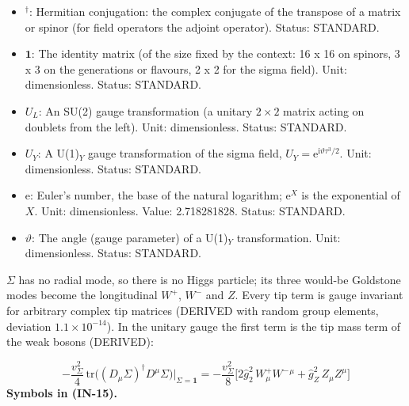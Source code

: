 \documentclass[
  10pt,
]{article}
\begin{document}
\begin{itemize}
\item
  \({}^\dagger\): Hermitian conjugation: the complex conjugate of the
  transpose of a matrix or spinor (for field operators the adjoint
  operator). Status: STANDARD.
\item
  \(\mathbf{1}\): The identity matrix (of the size fixed by the context:
  16 x 16 on spinors, 3 x 3 on the generations or flavours, 2 x 2 for
  the sigma field). Unit: dimensionless. Status: STANDARD.
\item
  \(U_L\): An SU(2) gauge transformation (a unitary \(2 \times 2\)
  matrix acting on doublets from the left). Unit: dimensionless. Status:
  STANDARD.
\item
  \(U_Y\): A U(1)\(_Y\) gauge transformation of the sigma field,
  \(U_Y = \mathrm{e}^{\mathrm{i}\vartheta\tau^3/2}\). Unit:
  dimensionless. Status: STANDARD.
\item
  \(\mathrm{e}\): Euler's number, the base of the natural logarithm;
  \(\mathrm{e}^{X}\) is the exponential of \(X\). Unit: dimensionless.
  Value: 2.718281828. Status: STANDARD.
\item
  \(\vartheta\): The angle (gauge parameter) of a U(1)\(_Y\)
  transformation. Unit: dimensionless. Status: STANDARD.
\end{itemize}

\(\Sigma\) has no radial mode, so there is no Higgs particle; its three
would-be Goldstone modes become the longitudinal \(W^+\), \(W^-\) and
\(Z\). Every tip term is gauge invariant for arbitrary complex tip
matrices (DERIVED with random group elements, deviation
\(1.1\times10^{-14}\)). In the unitary gauge the first term is the tip
mass term of the weak bosons (DERIVED):

\[
-\frac{v_\Sigma^2}{4}\,\mathrm{tr}\big((D_\mu\Sigma)^\dagger D^\mu\Sigma\big)\Big\vert_{\Sigma = \mathbf{1}}
= -\frac{v_\Sigma^2}{8}\Big[2\hat g_2^2\,W^+_\mu W^-{}^\mu + \hat g_Z^2\,Z_\mu Z^\mu\Big] \tag{IN-15}
\] \textbf{Symbols in (IN-15).}
\end{document}
